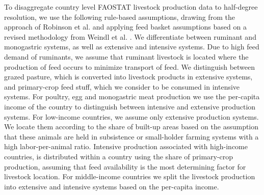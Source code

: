 \documentclass[gc, manuscript]{copernicus}
\begin{document}
To disaggregate country level FAOSTAT livestock production data to half-degree resolution, we use the following rule-based assumptions, drawing from the approach of Robinson et al. \citeyearpar{robinson_mapping_2014} and applying feed basket assumptions based on a revised methodology from Weindl et al. \citeyearpar{weindl_livestock_2017}. We differentiate between ruminant and monogastric systems, as well as extensive and intensive systems.
Due to high feed demand of ruminants, we assume that ruminant livestock is located where the production of feed occurs to minimize transport of feed. We distinguish between grazed pasture, which is converted into livestock products in extensive systems, and primary-crop feed stuff, which we consider to be consumed in intensive systems.
For poultry, egg and monogastric meat production we use the per-capita income of the country to distinguish between intensive and extensive production systems. For low-income countries, we assume only extensive production systems. We locate them according to the share of built-up areas based on the assumption that these animals are held in subsistence or small-holder farming systems with a high labor-per-animal ratio. Intensive production associated with high-income countries, is distributed within a country using the share of primary-crop production, assuming that feed availability is the most determining factor for livestock location. For middle-income countries we split the livestock production into extensive and intensive systems based on the per-capita income.
\end{document}

